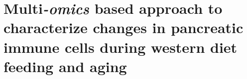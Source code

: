 
\chapter{Multi\textit{-omics} based approach to characterize changes in pancreatic immune cells during western diet feeding and aging}
\label{chp:diet_aging}




    
    
    
\clearpage

